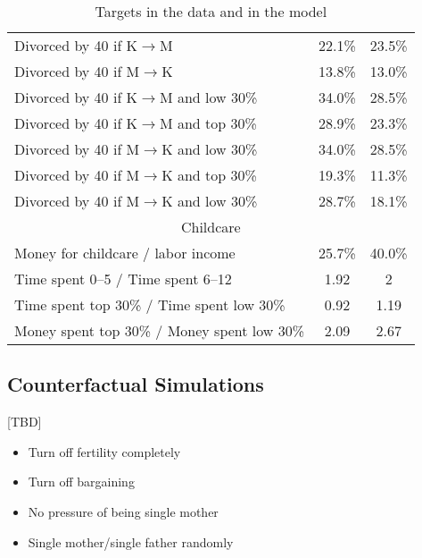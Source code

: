 \documentclass[12pt,letter]{article}
\begin{document}
\begin{table}
\begin{center}
\begin{tabular}{|l|c|c|}
Divorced by 40 if K$\to$M & 22.1\% &   23.5\% \\
Divorced by 40 if M$\to$K & 13.8\% &      13.0\% \\
Divorced by 40 if K$\to$M and low 30\% & 34.0\% & 28.5\% \\
Divorced by 40 if K$\to$M and top 30\% & 28.9\% & 23.3\% \\
Divorced by 40 if M$\to$K and low 30\% & 34.0\% & 28.5\% \\
Divorced by 40 if M$\to$K and top 30\% & 19.3\% & 11.3\% \\
Divorced by 40 if M$\to$K and low 30\% & 28.7\% & 18.1\% \\\hline
\multicolumn{3}{|c|}{Childcare} \\\hline
Money for childcare / labor income & 25.7\% & 40.0\% \\
Time spent 0--5 / Time spent 6--12 & 1.92 & 2 \\
Time spent top 30\% / Time spent low 30\% & 0.92 & 1.19 \\
Money spent top 30\% / Money spent low 30\% & 2.09 & 2.67 \\\hline

\end{tabular}
\caption{Targets in the data and in the model\label{targets-main}}
\end{center}
\end{table}


\subsection{Counterfactual Simulations}
[TBD]
\begin{itemize}
\item Turn off fertility completely
\item Turn off bargaining
\item No pressure of being single mother
\item Single mother/single father randomly
\end{itemize}
\end{document}
